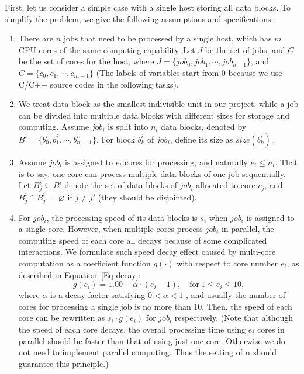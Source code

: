 \documentclass{llncs}
\begin{document}
	First, let us consider a simple case with a single host storing all data blocks. To simplify the problem, we give the following assumptions and specifications.
	
	\begin{enumerate}
		
		\item There are $n$ jobs that need to be processed by a single host, which has $m$ CPU cores of the same computing capability. Let $J$ be the set of jobs, and $C$ be the set of cores for the host, where $J = \{job_0, job_1, \cdots, job_{n-1}\}$, and $C = \{c_0, c_1, \cdots, c_{m-1}\}$ (The labels of variables start from 0 because we use C/C++ source codes in the following tasks).
		
		\vspace{2mm} 
		
		\item We treat data block as the smallest indivisible unit in our project, while a job can be divided into multiple data blocks with different sizes for storage and computing. Assume $job_i$ is split into $n_i$ data blocks, denoted by $B^i = \{b^i_{0}, b^i_{1}, \cdots, b^i_{n_i-1}\}$. For block $b^i_{k}$ of $job_i$, define its size as $size(b^i_{k})$.
		
		\vspace{2mm} 
		
		\item Assume $job_i$ is assigned to $e_i$ cores for processing, and naturally $e_i \leq n_i$. That is to say, one core can process multiple data blocks of one job sequentially. Let $B^i_{j}\subseteq B^i$ denote the set of data blocks of $job_i$ allocated to core $c_j$, and $B^i_{j} \cap B^i_{j'} = \varnothing$ if $j \neq j'$ (they should be disjointed). 
		
		\vspace{2mm} 
		
		\item For $job_i$, the processing speed of its data blocks is $s_i$ when $job_i$ is assigned to a single core. However, when multiple cores process $job_i$ in parallel, the computing speed of each core all decays because of some complicated interactions. We formulate such speed decay effect caused by multi-core computation as a coefficient function $g(\cdot)$ with respect to core number $e_i$, as described in Equation~\eqref{Eq-decay}:
		\begin{equation} \label{Eq-decay}
			g (e_i) = 1.00 - \alpha \cdot (e_i-1), \quad  \text{for} \ 1 \leq e_i \leq 10,
		\end{equation}
		where $\alpha$ is a decay factor satisfying $0 < \alpha < 1$ , and usually the number of cores for processing a single job is no more than 10. Then, the speed of each core can be rewritten as $s_i \cdot g(e_i)$ for $job_i$ respectively. (Note that although the speed of each core decays, the overall processing time using $e_i$ cores in parallel should be faster than that of using just one core. Otherwise we do not need to implement parallel computing. Thus the setting of $\alpha$ should guarantee this principle.)
		

\end{enumerate}
\end{document}

